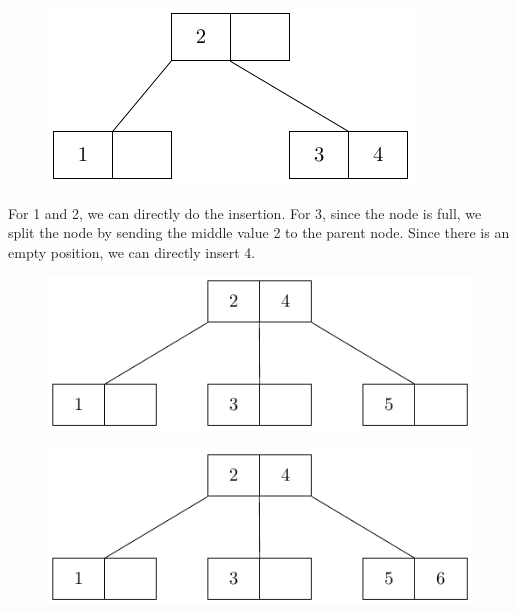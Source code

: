\begin{center}
\begin{minipage}{0.3\textwidth}
\begin{figure}[H]
\end{figure}
\end{minipage}\quad
\begin{minipage}{0.3\textwidth}
\begin{figure}[H]
  \centering
  \includegraphics[width=\textwidth]{Figure/BT_D4.pdf}
\end{figure}
\end{minipage}
\end{center}

For 1 and 2, we can directly do the insertion. For 3, since the node is full, we split the node by sending the middle value 2 to the parent node. Since there is an empty position, we can directly insert 4.

\begin{center}
\begin{minipage}{0.4\textwidth}
\begin{figure}[H]
  \centering
  \includegraphics[width=\textwidth]{Figure/BT_D5.pdf}
\end{figure}
\end{minipage}\quad
\begin{minipage}{0.4\textwidth}
\begin{figure}[H]
  \centering
  \includegraphics[width=\textwidth]{Figure/BT_D6.pdf}
\end{figure}
\end{minipage}
\end{center}

